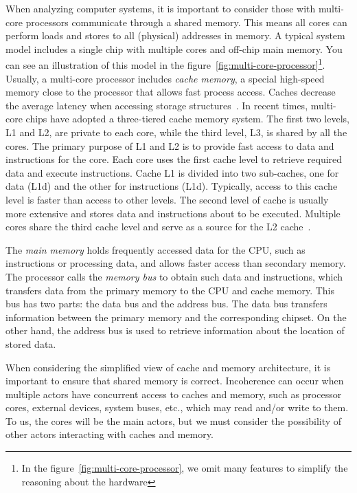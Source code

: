 When analyzing computer systems, it is important to consider those with multi-core processors communicate through a shared memory. This means all cores can perform loads and stores to all (physical) addresses in memory. A typical system model includes a single chip with multiple cores and off-chip main memory. You can see an illustration of this model in the figure~\ref{fig:multi-core-processor}\footnote{In the figure~\ref{fig:multi-core-processor}, we omit many features to simplify the reasoning about the hardware}. Usually, a multi-core processor includes \emph{cache memory}, a special high-speed memory close to the processor that allows fast process access. Caches decrease the average latency when accessing storage structures~\cite{DBLP_series_synthesis_2020Nagarajan, DBLP_series_synthesis_2013Scott}. In recent times, multi-core chips have adopted a three-tiered cache memory system. The first two levels, L1 and L2, are private to each core, while the third level, L3, is shared by all the cores. The primary purpose of L1 and L2 is to provide fast access to data and instructions for the core. Each core uses the first cache level to retrieve required data and execute instructions. Cache L1 is divided into two sub-caches, one for data (L1d) and the other for instructions (L1d). Typically, access to this cache level is faster than access to other levels. The second level of cache is usually more extensive and stores data and instructions about to be executed.
Multiple cores share the third cache level and serve as a source for the L2 cache~\cite{devices_amd64,guideintel}.


The \emph{main memory} holds frequently accessed data for the CPU, such as instructions or processing data, and allows faster access than secondary memory. The processor calls the \emph{memory bus} to obtain such data and instructions, which transfers data from the primary memory to the CPU and cache memory. This bus has two parts: the data bus and the address bus. The data bus transfers information between the primary memory and the corresponding chipset. On the other hand, the address bus is used to retrieve information about the location of stored data.


When considering the simplified view of cache and memory architecture, it is important to ensure that shared memory is correct. Incoherence can occur when multiple actors have concurrent access to caches and memory, such as processor cores, external devices, system buses, etc., which may read and/or write to them. To us, the cores will be the main actors, but we must consider the possibility of other actors interacting with caches and memory.


